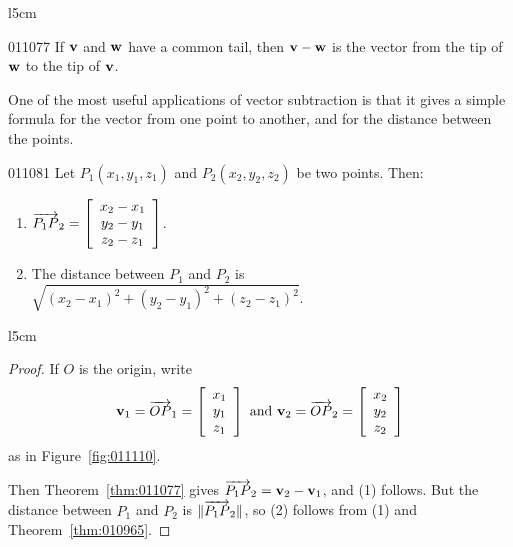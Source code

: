 \begin{wrapfigure}[5]{l}{5cm} 
	\centering
	
	\caption{\label{fig:011076}}
\end{wrapfigure}

\hfill
\begin{theorem}{}{011077}
If $\textbf{v}$ and $\textbf{w}$ have a common tail, then $\textbf{v} - \textbf{w}$ is the vector from the tip of $\textbf{w}$ to the tip of $\textbf{v}$.
\end{theorem}

One
 of the most useful applications of vector subtraction is that it gives a
 simple formula for the vector from one point to another, and for the 
distance between the points.
\vspace{2em}

\begin{theorem}{}{011081}
Let $P_{1}(x_{1}, y_{1}, z_{1})$ and $P_{2}(x_{2}, y_{2}, z_{2})$ be two points. Then:

\begin{enumerate}
\item  
$\overrightarrow{P_{1}P}_{2} = \left[
\begin{array}{c}
x_{2} - x_{1} \\
y_{2} - y_{1} \\
z_{2} - z_{1}   
\end{array}
\right]$.


\item The distance between $P_{1}$ and $P_{2}$ is $\sqrt{(x_{2} - x_{1})^2 + (y_{2} - y_{1})^2 + (z_{2} - z_{1})^2}$.

\end{enumerate}
\end{theorem}

\begin{wrapfigure}[8]{l}{5cm} 
\centering

\caption{\label{fig:011110}}
\end{wrapfigure}

\begin{proof}
If $O$ is the origin, write 
\begin{equation*}
\textbf{v}_{1} = \overrightarrow{OP}_{1}= \left[
\begin{array}{c}
x_{1} \\
y_{1} \\
z_{1}   
\end{array}
\right] \mbox{ and }
\textbf{v}_{2} = \overrightarrow{OP}_{2} = \left[
\begin{array}{c}
x_{2} \\
y_{2} \\
z_{2}   
\end{array}
\right]
\end{equation*}
as in Figure~\ref{fig:011110}.


 Then Theorem~\ref{thm:011077} gives
$\overrightarrow{P_{1}P}_{2} = \textbf{v}_{2} - \textbf{v}_{1}$, and (1) follows. But the distance between $P_{1}$ and $P_{2}$ is $\| \overrightarrow{P_{1}P}_{2} \|$, so (2) follows from (1) and Theorem~\ref{thm:010965}.
\end{proof}

